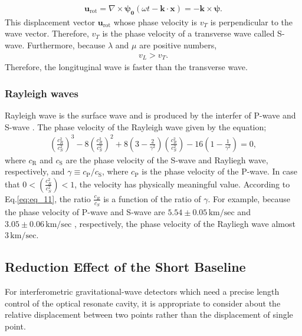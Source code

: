 \begin{eqnarray}
  \bm{u}_{\mathrm{rot}} = \nabla\times{\bm{\psi_{0}}(\omega{t}-\bm{k}\cdot{\bm{x}})} =-\bm{k}\times{\bm{\psi}}.
\end{eqnarray}
This displacement vector $\bm{u}_{\mathrm{rot}}$ whose phase velocity is $v_{T}$ is perpendicular to the wave vector. Therefore, $v_{T}$ is the phase velocity of a transverse wave called S-wave. Furthermore, because  $\lambda$ and $\mu$ are positive numbers, 
\begin{eqnarray}
  v_{L} > v_{T}.\label{eq:eq_10}
\end{eqnarray}
Therefore, the longituginal wave is faster than the transverse wave.



\subsubsection{Rayleigh waves}
Rayleigh wave is the surface wave and is produced by the interfer of P-wave and S-wave \cite{hasegawa2015jishin}. The phase velocity of the Rayleigh wave given by the equation;
\begin{eqnarray}\label{eq:eq_11}
\left(\frac{c_{R}^{2}}{c_{S}^{2}}\right)^{3}-8\left(\frac{c_{R}^{2}}{c_{S}^{2}}\right)^{2}+8\left(3-\frac{2}{\gamma^2}\right)\left(\frac{c_{R}^{2}}{c_{S}^{2}}\right)-16\left(1-\frac{1}{\gamma^2}\right)=0,
\end{eqnarray}
where $c_{\mathrm{R}}$ and $c_{\mathrm{S}}$ are the phase velocity of the S-wave and Rayliegh wave, respectively, and $\gamma\equiv c_{\mathrm{P}}/c_{\mathrm{S}}$, where $c_{\mathrm{P}}$ is the phase velocity of the P-wave. In case that $0 < (\frac{c_{R}^2}{c_{S}^2}) <1$, the velocity has physically meaningful value. According to Eq.\ref{eq:eq_11}, the ratio $\frac{c_R}{c_S}$ is a function of the ratio of $\gamma$. For example, because the phase velocity of P-wave and S-wave are $5.54\pm0.05\,\mathrm{km/sec}$ and $3.05\pm0.06\,\mathrm{km/sec}$ \cite{takemoto2003}, respectively, the phase velocity of the Rayliegh wave almost $3\,\mathrm{km/sec}$.


\subsection{Reduction Effect of the Short Baseline} \label{sec:313}
For interferometric gravitational-wave detectors which need a precise length control of the optical resonate cavity, it is appropriate to consider about the relative displacement between two points rather than the displacement of single point.



